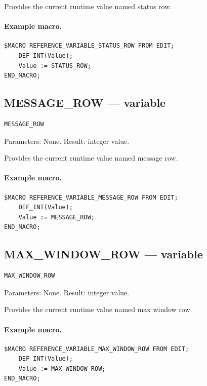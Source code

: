\documentclass[a4paper,10pt,twoside,openany]{book}
\begin{document}
Provides the current runtime value named status row.

\paragraph{Example macro.}
\begin{verbatim}
$MACRO REFERENCE_VARIABLE_STATUS_ROW FROM EDIT;
    DEF_INT(Value);
    Value := STATUS_ROW;
END_MACRO;
\end{verbatim}

\label{prim:variable-message-row}
\subsection*{MESSAGE\_ROW --- variable}
\begin{verbatim}
MESSAGE_ROW
\end{verbatim}
Parameters: None. Result: integer value.

Provides the current runtime value named message row.

\paragraph{Example macro.}
\begin{verbatim}
$MACRO REFERENCE_VARIABLE_MESSAGE_ROW FROM EDIT;
    DEF_INT(Value);
    Value := MESSAGE_ROW;
END_MACRO;
\end{verbatim}

\label{prim:variable-max-window-row}
\subsection*{MAX\_WINDOW\_ROW --- variable}
\begin{verbatim}
MAX_WINDOW_ROW
\end{verbatim}
Parameters: None. Result: integer value.

Provides the current runtime value named max window row.

\paragraph{Example macro.}
\begin{verbatim}
$MACRO REFERENCE_VARIABLE_MAX_WINDOW_ROW FROM EDIT;
    DEF_INT(Value);
    Value := MAX_WINDOW_ROW;
END_MACRO;
\end{verbatim}
\end{document}
